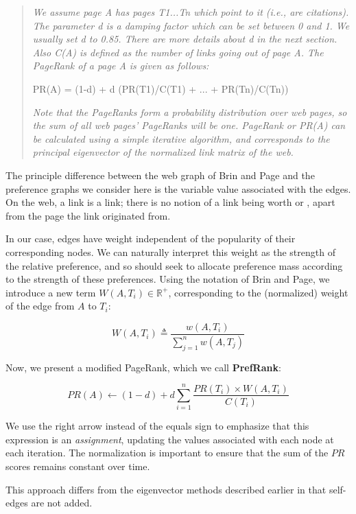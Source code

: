 \begin{quotation}
	\textit{We assume page A has pages T1...Tn which point to it (i.e., are citations).
	The parameter d is a damping factor which can be set between 0 and 1.
	We usually set d to 0.85.
	There are more details about d in the next section.
	Also C(A) is defined as the number of links going out of page A.
	The PageRank of a page A is given as follows:}
	
	\bigskip
		
	PR(A) = (1-d) + d (PR(T1)/C(T1) + ... + PR(Tn)/C(Tn))
	
	\bigskip
	
	\textit{Note that the PageRanks form a probability distribution over web pages, so the sum of all web pages’ PageRanks will be one.
	PageRank or PR(A) can be calculated using a simple iterative algorithm, and corresponds to the principal eigenvector of the normalized link matrix of the web.}
\end{quotation}

The principle difference between the web graph of Brin and Page and the preference graphs we consider here is the variable value associated with the edges.
On the web, a link is a link; there is no notion of a link being worth  or , apart from the page the link originated from.

In our case, edges have weight independent of the popularity of their corresponding nodes.
We can naturally interpret this weight as the strength of the relative preference, and so should seek to allocate preference mass according to the strength of these preferences.
Using the notation of Brin and Page, we introduce a new term $W(A, T_i) \in \mathbb{R}^+$, corresponding to the (normalized) weight of the edge from $A$ to $T_i$:

\[
W(A, T_i) \triangleq \frac{w(A, T_i)}{\sum_{j=1}^n w(A, T_j)}
\]

Now, we present a modified PageRank, which we call \textbf{PrefRank}:

\[
PR(A) \leftarrow (1-d) + d \sum_{i=1}^n \frac{PR(T_i) \times W(A,T_i)}{C(T_i)}
\]

We use the right arrow instead of the equals sign to emphasize that this expression is an \textit{assignment}, updating the values associated with each node at each iteration.
The normalization is important to ensure that the sum of the $PR$ scores remains constant over time.

This approach differs from the eigenvector methods described earlier in that self-edges are not added.

